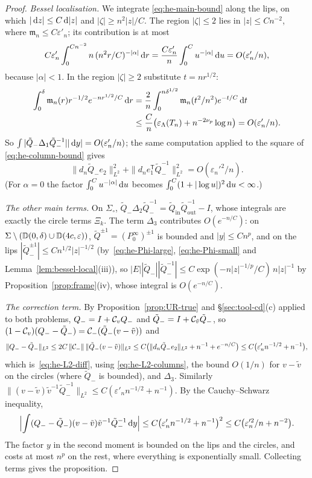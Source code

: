 \begin{proof}
\emph{Bessel localisation.} We integrate \eqref{eq:he-main-bound} along the lips, on which $|\,\mathrm{d} z|\le C\,\mathrm{d}|z|$ and
$|\zeta|\ge n^2|z|/C$. The region $|\zeta|\le2$ lies in $|z|\le Cn^{-2}$, where $\mathfrak m_n\le C\varepsilon'_n$; its
contribution is at most
\[
  C\varepsilon'_n\int_0^{Cn^{-2}}n\,(n^2r/C)^{-|\alpha|}\,\mathrm{d} r=\frac{C\varepsilon'_n}{n}\int_0^{C}u^{-|\alpha|}\,\mathrm{d} u
  =O(\varepsilon'_n/n),
\]
because $|\alpha|<1$. In the region $|\zeta|\ge2$ substitute $t=nr^{1/2}$:
\begin{align*}
  \int_0^\delta\mathfrak m_n(r)r^{-1/2}e^{-nr^{1/2}/C}\,\mathrm{d} r&=\frac2n\int_0^{n\delta^{1/2}}\mathfrak m_n(t^2/n^2)e^{-t/C}\,\mathrm{d} t\\
  &\le\frac Cn\bigl(\varepsilon_\Lambda(T_n)+n^{-2\nu_p}\log n\bigr)=O(\varepsilon'_n/n).
\end{align*}
So $\int|\tilde Q_-\Delta_1\tilde Q_-^{-1}||\,\mathrm{d} y|=O(\varepsilon'_n/n)$; the same computation applied to the square of
\eqref{eq:he-column-bound} gives
\begin{equation}\label{eq:he-L2-columns}
  \|d_n\tilde Q_-e_2\|_{L^2}^2+\|d_ne_1^{\mathsf T}\tilde Q_-^{-1}\|_{L^2}^2=O(\varepsilon_n'^2/n).
\end{equation}
(For $\alpha=0$ the factor $\int_0^Cu^{-|\alpha|}\,\mathrm{d} u$ becomes $\int_0^C(1+|\log u|)^2\,\mathrm{d} u<\infty$.)

\emph{The other main terms.} On $\Sigma_{\circ}$, $\tilde Q_-\Delta_2\tilde Q_-^{-1}=\tilde Q_{\mathrm{in}}\tilde
Q_{\mathrm{out}}^{-1}-I$, whose integrals are exactly the circle terms $\Xi_k$. The term $\Delta_3$ contributes
$O(e^{-n/C})$: on $\Sigma\setminus(\mathbb D(0,\delta)\cup \mathbb D(4c,\varepsilon))$, $\tilde Q^{\pm1}=(P^\infty_0)^{\pm1}$ is bounded and
$|y|\le Cn^p$, and on the lips $|\tilde Q_-^{\pm1}|\le Cn^{1/2}|z|^{-1/2}$ (by~\eqref{eq:he-Phi-large}, \eqref{eq:he-Phi-small} and
Lemma~\ref{lem:bessel-local}(iii)), so $|E||\tilde Q_-||\tilde Q_-^{-1}|\le C\exp(-n|z|^{-1/p}/C)\,n|z|^{-1}$ by Proposition~\ref{prop:frame}(iv), whose integral is
$O(e^{-n/C})$.

\emph{The correction term.} By Proposition~\ref{prop:UR-true} and \S\ref{sec:tool-cd}(c) applied to both problems, $Q_-=I+\mathcal{C}_v
Q_-$ and $\tilde Q_-=I+\mathcal{C}_{\tilde v}\tilde Q_-$, so $(1-\mathcal{C}_v)(Q_--\tilde Q_-)=\mathcal{C}_-(\tilde Q_-(v-\tilde v))$ and
\[
  \|Q_--\tilde Q_-\|_{L^2}\le2C\,\|\mathcal{C}_-\|\,\|\tilde Q_-(v-\tilde v)\|_{L^2}
  \le C\bigl(\|d_n\tilde Q_-e_2\|_{L^2}+n^{-1}+e^{-n/C}\bigr)\le C\bigl(\varepsilon'_nn^{-1/2}+n^{-1}\bigr),
\]
which is~\eqref{eq:he-L2-diff}, using \eqref{eq:he-L2-columns}, the bound $O(1/n)$ for $v-\tilde v$ on the circles (where $\tilde Q_-$ is bounded), and
$\Delta_3$. Similarly $\|(v-\tilde v)\tilde v^{-1}\tilde Q_-^{-1}\|_{L^2}\le C(\varepsilon'_nn^{-1/2}+n^{-1})$. By the
Cauchy--Schwarz inequality,
\[
  \Bigl|\int(Q_--\tilde Q_-)(v-\tilde v)\tilde v^{-1}\tilde Q_-^{-1}\,\mathrm{d} y\Bigr|\le C\bigl(\varepsilon'_nn^{-1/2}+n^{-1}\bigr)^2
  \le C\bigl(\varepsilon_n'^2/n+n^{-2}\bigr).
\]
The factor $y$ in the second moment is bounded on the lips and the circles, and costs at most $n^p$ on the rest, where
everything is exponentially small. Collecting terms gives the proposition.
\end{proof}

